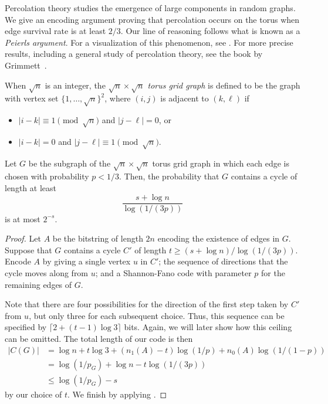\documentclass{patmorin}
\begin{document}
Percolation theory studies the emergence of large components in random
graphs. We give an encoding argument proving that percolation occurs
on the torus when edge survival rate is at least $2/3$. Our line of
reasoning follows what is known as a \emph{Peierls argument}. For a
visualization of this phenomenon, see . For more
precise results, including a general study of percolation theory, see
the book by Grimmett~\cite{grimmett:percolation}.

When $\sqrt{n}$ is an integer, the \emph{$\sqrt{n} \times \sqrt{n}$
  torus grid graph} is defined to be the graph with vertex set $\{1,
\ldots, \sqrt{n}\}^2$, where $(i, j)$ is adjacent to $(k, \ell)$ if
\begin{itemize}
\item $|i - k| \equiv 1 \pmod{\sqrt{n}}$ and $|j - \ell| = 0$, or
\item $|i - k| = 0$ and $|j - \ell| \equiv 1 \pmod{\sqrt{n}}$.
\end{itemize}

\begin{thm}
  Let $G$ be the subgraph of the $\sqrt{n} \times \sqrt{n}$ torus grid
  graph in which each edge is chosen with probability $p < 1/3$. Then,
  the probability that $G$ contains a cycle of length at least
  \[
  \frac{s + \log n}{\log (1/(3p))}
  \]
  is at most $2^{-s}$.
\end{thm}

\begin{proof}
  Let $A$ be the bitstring of length $2n$ encoding the existence of
  edges in $G$. Suppose that $G$ contains a cycle $C'$ of length $t
  \geq (s + \log n)/\log (1/(3p))$. Encode $A$ by giving a single
  vertex $u$ in $C'$; the sequence of directions that the cycle moves
  along from $u$; and a Shannon-Fano code with parameter $p$ for the
  remaining edges of $G$.

  Note that there are four possibilities for the direction of the
  first step taken by $C'$ from $u$, but only three for each
  subsequent choice. Thus, this sequence can be specified by $\lceil 2
  + (t - 1) \log 3 \rceil$ bits. Again, we will later show how this
  ceiling can be omitted. The total length of our code is then
  \begin{align*}
    |C(G)| &= \log n + t \log 3 + (n_1(A) - t) \log (1/p) +
    n_0(A) \log (1/(1 - p)) \\
    &= \log (1/p_G) + \log n - t \log (1/(3p)) \\
    &\leq \log (1/p_G) - s
  \end{align*}
  by our choice of $t$. We finish by applying .
\end{proof}
\end{document}

